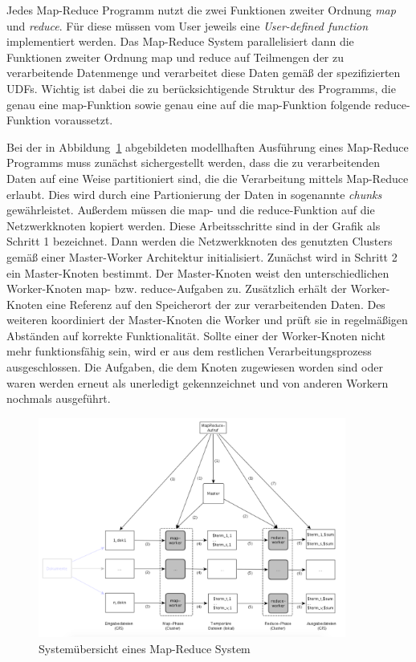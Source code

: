 Jedes Map-Reduce Programm nutzt die zwei Funktionen zweiter Ordnung \textit{map} und \textit{reduce}. Für diese müssen vom User jeweils eine \textit{User-defined function} implementiert werden. Das Map-Reduce System parallelisiert dann die Funktionen zweiter Ordnung map und reduce auf Teilmengen der zu verarbeitende Datenmenge und verarbeitet diese Daten gemäß der spezifizierten UDFs. Wichtig ist dabei die zu berücksichtigende Struktur des Programms, die genau eine map-Funktion sowie genau eine auf die map-Funktion folgende reduce-Funktion voraussetzt. 

Bei der in Abbildung~\ref{graphicMapReduceSystem} abgebildeten modellhaften Ausführung eines Map-Reduce Programms muss zunächst sichergestellt werden, dass die zu verarbeitenden Daten auf eine Weise partitioniert sind, die die Verarbeitung mittels Map-Reduce erlaubt. Dies wird durch eine Partionierung der Daten in sogenannte \textit{chunks} gewährleistet. Außerdem müssen die map- und die reduce-Funktion auf die Netzwerkknoten kopiert werden. Diese Arbeitsschritte sind in der Grafik als Schritt 1 bezeichnet. Dann werden die Netzwerkknoten des genutzten Clusters gemäß einer Master-Worker Architektur initialisiert. Zunächst wird in Schritt 2 ein Master-Knoten bestimmt. Der Master-Knoten weist den unterschiedlichen Worker-Knoten map- bzw. reduce-Aufgaben zu. Zusätzlich erhält der Worker-Knoten eine Referenz auf den Speicherort der zur verarbeitenden Daten. Des weiteren koordiniert der Master-Knoten die Worker und prüft sie in regelmäßigen Abständen auf korrekte Funktionalität. Sollte einer der Worker-Knoten nicht mehr funktionsfähig sein, wird er aus dem restlichen Verarbeitungsprozess ausgeschlossen. Die Aufgaben, die dem Knoten zugewiesen worden sind oder waren werden erneut als unerledigt gekennzeichnet und von anderen Workern nochmals ausgeführt. 

\begin{figure}[h]
	\centering
	\includegraphics[width=0.9\textwidth]{picture/map_reduce_system_example.png}
	\caption{Systemübersicht eines Map-Reduce System \cite{Bethge2009}}
	\label{graphicMapReduceSystem}
\end{figure}


